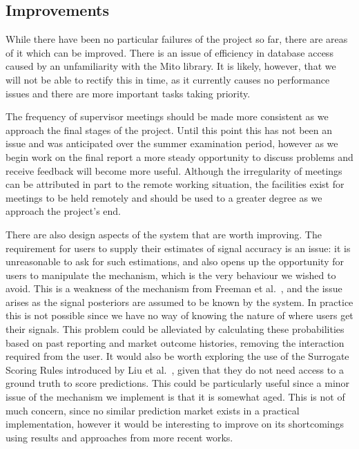 \documentclass[10pt,a4paper]{article}
\theoremstyle{plain}
\theoremstyle{definition}
\begin{document}
\subsection{Improvements}

While there have been no particular failures of the project so far, there are
areas of it which can be improved. There is an issue of efficiency in database
access caused by an unfamiliarity with the Mito library. It is likely, however,
that we will not be able to rectify this in time, as it currently causes no
performance issues and there are more important tasks taking priority.

The frequency of supervisor meetings should be made more consistent as we
approach the final stages of the project. Until this point this has not been an
issue and was anticipated over the summer examination period, however as we
begin work on the final report a more steady opportunity to discuss problems
and receive feedback will become more useful. Although the irregularity of
meetings can be attributed in part to the remote working situation, the
facilities exist for meetings to be held remotely and should be used to a
greater degree as we approach the project's end.

There are also design aspects of the system that are worth improving. The
requirement for users to supply their estimates of signal accuracy is an issue:
it is unreasonable to ask for such estimations, and also opens up the
opportunity for users to manipulate the mechanism, which is the very behaviour
we wished to avoid. This is a weakness of the mechanism from Freeman et
al.~\cite{CODiPM}, and the issue arises as the signal posteriors are assumed to
be known by the system. In practice this is not possible since we have no way
of knowing the nature of where users get their signals. This problem could be
alleviated by calculating these probabilities based on past reporting and
market outcome histories, removing the interaction required from the user. It
would also be worth exploring the use of the Surrogate Scoring Rules introduced
by Liu et al.~\cite{Liu2020}, given that they do not need access to a ground
truth to score predictions. This could be particularly useful since a minor
issue of the mechanism we implement is that it is somewhat aged. This is not of
much concern, since no similar prediction market exists in a practical
implementation, however it would be interesting to improve on its shortcomings
using results and approaches from more recent works.

\end{document}
